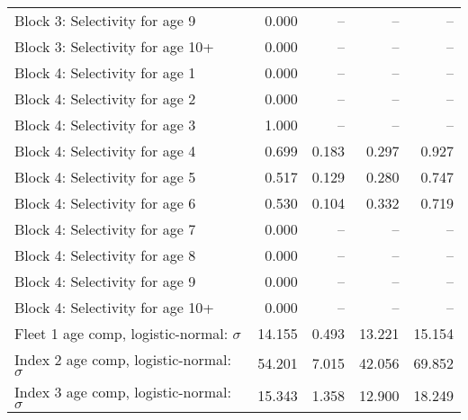 \documentclass[
]{article}
\begin{document}
\begin{landscape}
\begin{longtable}[t]{lrrrr}
Block 3: Selectivity for age 9 & 0.000 & -- & -- & --\\
Block 3: Selectivity for age 10+ & 0.000 & -- & -- & --\\
Block 4: Selectivity for age 1 & 0.000 & -- & -- & --\\
Block 4: Selectivity for age 2 & 0.000 & -- & -- & --\\
\addlinespace
Block 4: Selectivity for age 3 & 1.000 & -- & -- & --\\
Block 4: Selectivity for age 4 & 0.699 & 0.183 & 0.297 & 0.927\\
Block 4: Selectivity for age 5 & 0.517 & 0.129 & 0.280 & 0.747\\
Block 4: Selectivity for age 6 & 0.530 & 0.104 & 0.332 & 0.719\\
Block 4: Selectivity for age 7 & 0.000 & -- & -- & --\\
\addlinespace
Block 4: Selectivity for age 8 & 0.000 & -- & -- & --\\
Block 4: Selectivity for age 9 & 0.000 & -- & -- & --\\
Block 4: Selectivity for age 10+ & 0.000 & -- & -- & --\\
Fleet 1 age comp, logistic-normal: $\sigma$ & 14.155 & 0.493 & 13.221 & 15.154\\
Index 2 age comp, logistic-normal: $\sigma$ & 54.201 & 7.015 & 42.056 & 69.852\\
\addlinespace
Index 3 age comp, logistic-normal: $\sigma$ & 15.343 & 1.358 & 12.900 & 18.249\\*
\end{longtable}
\end{landscape}
\end{document}
